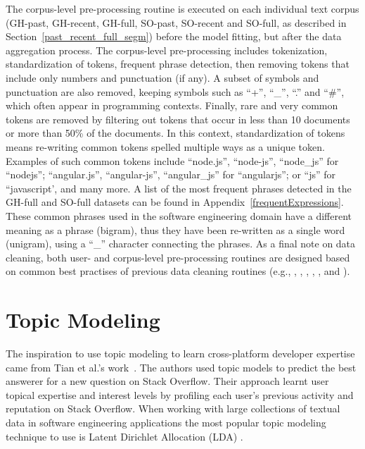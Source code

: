         The corpus-level pre-processing routine is executed on each individual text corpus (GH-past, GH-recent, GH-full, SO-past, SO-recent and SO-full, as described in Section~\ref{past_recent_full_segm}) before the model fitting, but after the data aggregation process. The corpus-level pre-processing includes tokenization, standardization of tokens, frequent phrase detection, then removing tokens that include only numbers and punctuation (if any). A subset of symbols and punctuation are also removed, keeping symbols such as ``+'', ``\_'', ``.'' and ``\#'', which often appear in programming contexts. Finally, rare and very common tokens are removed by filtering out tokens that occur in less than 10 documents or more than 50\% of the documents. In this context, standardization of tokens means re-writing common tokens spelled multiple ways as a unique token. Examples of such common tokens include ``node.js'', ``node-js'', ``node\_js'' for ``nodejs''; ``angular.js'', ``angular-js'', ``angular\_js'' for ``angularjs''; or ``js'' for ``javascript', and many more. A list of the most frequent phrases detected in the GH-full and SO-full datasets can be found in Appendix~\ref{frequentExpressions}. These common phrases used in the software engineering domain have a different meaning as a phrase (bigram), thus they have been re-written as a single word (unigram), using a ``\_'' character connecting the phrases. As a final note on data cleaning, both user- and corpus-level pre-processing routines are designed based on common best practises of previous data cleaning routines (e.g., \cite{tian2013predicting}, \cite{campbell2015latent}, \cite{treude2019predicting}, \cite{efstathiou2018word}, \cite{boyd2014care}, and \cite{liao2019status}).

\section{Topic Modeling\label{sec:topic_modeling}}

    The inspiration to use topic modeling to learn cross-platform developer expertise came from Tian et al.'s work~\cite{tian2013predicting}. The authors used topic models to predict the best answerer for a new question on Stack Overflow. Their approach learnt user topical expertise and interest levels by profiling each user's previous activity and reputation on Stack Overflow. When working with large collections of textual data in software engineering applications the most popular topic modeling technique to use is Latent Dirichlet Allocation (LDA) \cite{campbell2015latent}. 
    
